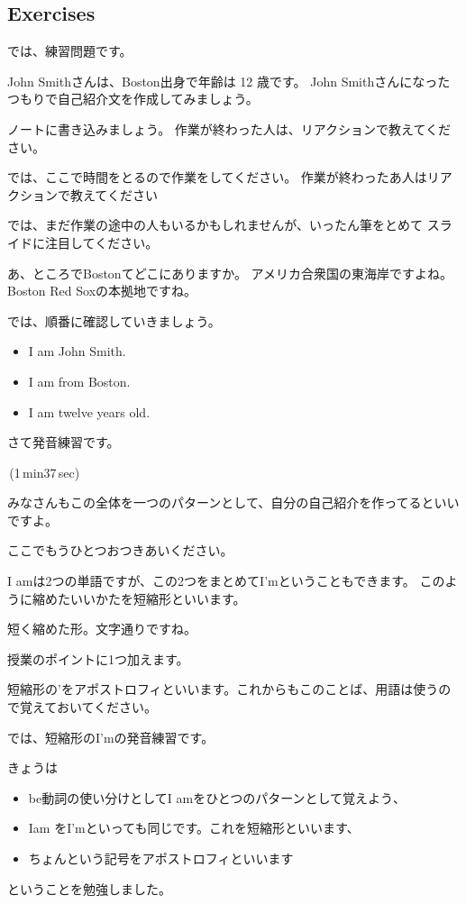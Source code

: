 \documentclass[book,jafontscale=0.9247]{jlreq}
\newenvironment{my_check}
  {\begin{itemize}
    \renewcommand\labelitemi{$\square\hspace{0.5em}$}} %
  {\end{itemize}}
\newcommand{\mySagyo}{%
\par%
\bigskip
では、ここで時間をとるので作業をしてください。
作業が終わったあ人はリアクションで教えてください\par%
\begin{minipage}[t]{.98\textwidth}
\mbox{}\hrulefill\mbox{}\par%
\mbox{}\hfill{}\raisebox{-.5\height}{作業}\hfill\mbox{}\par%
\mbox{}\hrulefill\mbox{}
\end{minipage}%
\par%
\bigskip%
では、まだ作業の途中の人もいるかもしれませんが、いったん筆をとめて
スライドに注目してください。%
\par%
\bigskip
}
\newcommand{\myStartLesson}{%
\vspace*{5pt}%
\noindent{}{\Large\gtfamily 授業スタート！}
\begin{my_check}
\item マイクON
\item カメラON\hspace{40pt}{\LARGE \ComputerMouse}
\end{my_check}
みなさん、こんにちは。
エデュオプちばの英語の授業にようこそ。\par
さて
音声は届いていますか？
なにかトラブルがあったら、チャットで教えてください。
どうぞよろしくお願いします。\par
きょうも暑いですね。
体調管理にはじゅうぶん気をつけてください。
みなさんも熱中症にならないように、
適切な水分補給をお願いします。
授業中でも差し支えありません。
遠慮なく水分を補給しながら、
リラックスして参加してください。\par
それでは授業にはいります。
\begin{my_check}
\item カメラOFF\hspace{40pt}{\LARGE \ComputerMouse}
\end{my_check}
}
\begin{document}
\newpage
\subsection{Exercises}
では、練習問題です。

John Smithさんは、Boston出身で年齢は 12 歳です。
John Smithさんになったつもりで自己紹介文を作成してみましょう。


ノートに書き込みましょう。
作業が終わった人は、リアクションで教えてください。

\mySagyo

あ、ところでBostonてどこにありますか。
アメリカ合衆国の東海岸ですよね。
Boston Red Soxの本拠地ですね。

では、順番に確認していきましょう。

\begin{itemize}
 \item I am John Smith.
 \item I am from Boston.
 \item I am twelve years old.
\end{itemize}

さて発音練習です。

\faVolumeUp\,(1\,min37\,sec)

みなさんもこの全体を一つのパターンとして、自分の自己紹介を作ってるといいですよ。


ここでもうひとつおつきあいください。

{\large \ComputerMouse}

I amは2つの単語ですが、この2つをまとめてI'mということもできます。
このように縮めたいいかたを短縮形といいます。

短く縮めた形。文字通りですね。

授業のポイントに1つ加えます。

短縮形の'をアポストロフィといいます。これからもこのことば、用語は使うので覚えておいてください。


では、短縮形のI'mの発音練習です。

きょうは
\begin{itemize}
 \item be動詞の使い分けとしてI amをひとつのパターンとして覚えよう、
 \item Iam をI'mといっても同じです。これを短縮形といいます、
 \item ちょんという記号をアポストロフィといいます
\end{itemize}
ということを勉強しました。


{\large \ComputerMouse}
\newpage
%
%
%
%
%
\end{document}
